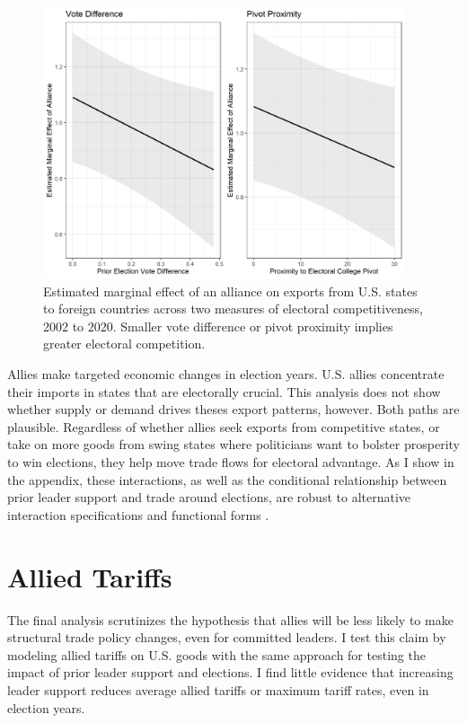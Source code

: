 \documentclass[12pt]{article}
\begin{document}
\begin{figure}[htpb]
	\centering
		\includegraphics[width=0.95\textwidth]{../figures/me-all-state.png}
	\caption{Estimated marginal effect of an alliance on exports from U.S. states to foreign countries across two measures of electoral competitiveness, 2002 to 2020. Smaller vote difference or pivot proximity implies greater electoral competition.}
	\label{fig:me-all-state}
\end{figure}


Allies make targeted economic changes in election years. 
U.S. allies concentrate their imports in states that are electorally crucial.
This analysis does not show whether supply or demand drives theses export patterns, however. 
Both paths are plausible. 
Regardless of whether allies seek exports from competitive states, or take on more goods from swing states where politicians want to bolster prosperity to win elections, they help move trade flows for electoral advantage. 
As I show in the appendix, these interactions, as well as the conditional relationship between prior leader support and trade around elections, are robust to alternative interaction specifications and functional forms \citep{Hainmuelleretal2019}.



\section{Allied Tariffs} 


The final analysis scrutinizes the hypothesis that allies will be less likely to make structural trade policy changes, even for committed leaders. 
I test this claim by modeling allied tariffs on U.S. goods with the same approach for testing the impact of prior leader support and elections. 
I find little evidence that increasing leader support reduces average allied tariffs or maximum tariff rates, even in election years.
\end{document}
